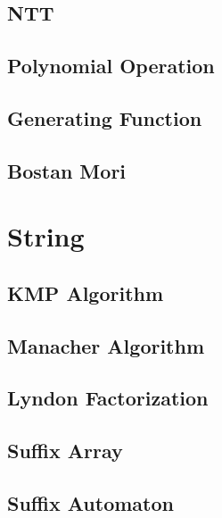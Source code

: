 \documentclass[a4paper,10pt,oneside]{article}
\begin{document}
\subsection{NTT}


\subsection{Polynomial Operation}


\subsection{Generating Function}


\subsection{Bostan Mori}


\section{String}

\subsection{KMP Algorithm}


\subsection{Manacher Algorithm}


\subsection{Lyndon Factorization}


\subsection{Suffix Array}


\subsection{Suffix Automaton}

\end{document}
